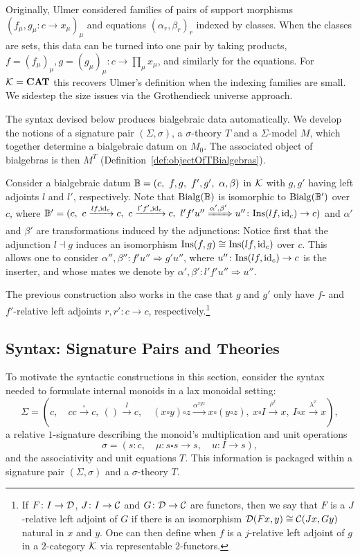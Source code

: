 Originally, Ulmer considered families of pairs of support morphisms $(f_\mu,g_\mu\colon c\to x_\mu)_{\mu}$ and equations $(\alpha_r,\beta_r)_{r}$ indexed by classes. When the classes are sets, this data can be turned into one pair by taking products, $f=(f_\mu)_\mu, g= (g_\mu)_\mu\colon c\to\prod_\mu x_\mu$, and similarly for the equations. For $\mathcal{K}=\mathbf{CAT}$ this recovers Ulmer's definition \cite{Ulmer1977Bialgebras} when the indexing families are small. We sidestep the size issues via the Grothendieck universe approach.

The syntax devised below produces bialgebraic data automatically. We develop the notions of a signature pair $(\Sigma,\sigma)$, a $\sigma$-theory $T$ and a $\Sigma$-model $M$, which together determine a bialgebraic datum on $M_0$. The associated object of bialgebras is then $M^T$ (Definition~\ref{def:objectOfTBialgebras}).

\begin{remark}\label{rmk:AdjointsInducingIsosBetweenBialgebras}
    Consider a bialgebraic datum $\B = (c,\ f,g,\ f',g',\ \alpha,\beta)$ in $\mathcal{K}$ with $g,g'$ having left adjoints $l$ and $l'$, respectively. Note that $\mathrm{Bialg}(\mathbb{B})$ is isomorphic to $\mathrm{Bialg}(\mathbb{B}')$ over $c$, where $\B' = (c,\ c\xrightarrow{lf,\id_c} c,\ c\xrightarrow{l'f',\id_c}c,\ l'f'u''\xRightarrow{\alpha',\beta'} u''\colon \Ins(lf,\id_c)\to c)$ and $\alpha'$ and $\beta'$ are transformations induced by the adjunctions: Notice first that the adjunction $l\dashv g$ induces an isomorphism $\mathrm{Ins}(f,g)\cong \mathrm{Ins}(lf,\mathrm{id}_c)$ over $c$. This allows one to consider $\alpha'',\beta''\colon f'u''\Rightarrow g'u''$, where $u''\colon \mathrm{Ins}(lf,\mathrm{id}_c)\to c$ is the inserter, and whose mates we denote by $\alpha',\beta'\colon l'f'u''\Rightarrow u''$.

    The previous construction also works in the case that $g$ and $g'$ only have $f$- and $f'$-relative left adjoints $r,r'\colon c\to c$, respectively.\footnote{If $F\colon I\to \mathcal{D}$, $J\colon I\to \mathcal{C}$ and $G\colon \mathcal{D}\to \mathcal{C}$ are functors, then we say that $F$ is a $J$-relative left adjoint of $G$ if there is an isomorphism $\mathcal{D}(Fx,y)\cong \mathcal{C}(Jx,Gy)$ natural in $x$ and $y$. One can then define when $f$ is a $j$-relative left adjoint of $g$ in a $2$-category $\mathcal{K}$ via representable $2$-functors.}
\end{remark}

\subsection{Syntax: Signature Pairs and Theories}
To motivate the syntactic constructions in this section, consider the syntax needed to formulate internal monoids in a lax monoidal setting:
\[
\Sigma = (c, \quad cc\xrightarrow{\square} c,\ ()\xrightarrow{I} c, \quad (x\square y)\square z\xrightarrow{\alpha^{xyz}}x\square (y\square z),\ x\square I\xrightarrow{\rho^x} x,\ I\square x\xrightarrow{\lambda^x} x),
\]
a relative $1$-signature describing the monoid's multiplication and unit operations
\[
\sigma = (s\colon c, \quad \mu\colon s\square s\to s, \quad u\colon I\to s),
\]
and the associativity and unit equations $T$. This information is packaged within a signature pair $(\Sigma,\sigma)$ and a $\sigma$-theory $T$.

